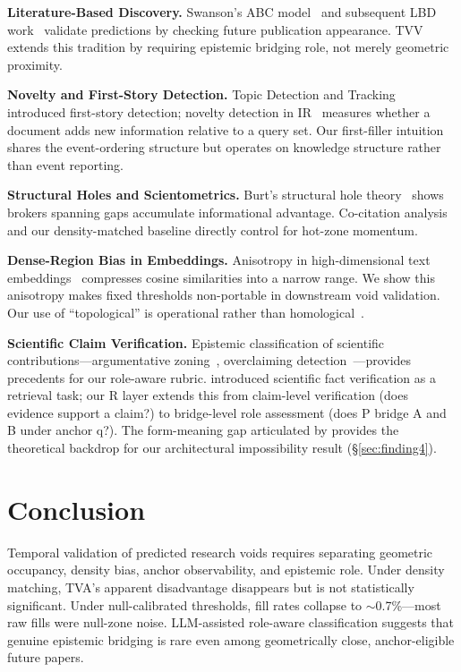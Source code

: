 \documentclass[11pt,twocolumn]{article}
\newcommand{\tva}{\textsf{TVA}}
\newcommand{\tvv}{\textsf{TVV}}
\begin{document}
\textbf{Literature-Based Discovery.}
Swanson's ABC model~\cite{swanson1986fish} and subsequent LBD work~\cite{gordon1996using,weeber2001using} validate predictions by checking future
publication appearance. \tvv{} extends this tradition by requiring epistemic bridging
role, not merely geometric proximity.

\textbf{Novelty and First-Story Detection.}
Topic Detection and Tracking~\cite{allan1998topic} introduced first-story detection; novelty detection in IR~\cite{zhang2002novelty}
measures whether a document adds new information relative to a query set. Our
first-filler intuition shares the event-ordering structure but operates on knowledge
structure rather than event reporting.

\textbf{Structural Holes and Scientometrics.}
Burt's structural hole theory~\cite{burt2004structural} shows brokers spanning gaps accumulate informational
advantage. Co-citation analysis~\cite{small1973cocitation} and our density-matched baseline directly control for hot-zone momentum.

\textbf{Dense-Region Bias in Embeddings.}
Anisotropy in high-dimensional text embeddings~\cite{ethayarajh2019contextual} compresses cosine similarities into a
narrow range. We show this anisotropy makes fixed thresholds non-portable in
downstream void validation. Our use of ``topological'' is operational rather than
homological~\cite{carlsson2009topology,edelsbrunner2010computational}.

\textbf{Scientific Claim Verification.}
Epistemic classification of scientific contributions---argumentative zoning~\cite{teufel2002summarizing},
overclaiming detection~\cite{wright2022generating}---provides precedents for our role-aware rubric. \cite{wadden2020scifact} introduced scientific fact verification as a retrieval task; our R layer extends this from claim-level verification (does evidence support a claim?) to bridge-level role assessment (does P bridge A and B under anchor q?). The form-meaning gap articulated by \cite{bender2020climbing} provides the theoretical backdrop for our architectural impossibility result (\S\ref{sec:finding4}).

\section{Conclusion}

Temporal validation of predicted research voids requires separating geometric occupancy,
density bias, anchor observability, and epistemic role.
Under density matching, \tva{}'s apparent disadvantage disappears but is not
statistically significant. Under null-calibrated thresholds, fill rates collapse to
$\sim$0.7\%---most raw fills were null-zone noise.
LLM-assisted role-aware classification suggests that genuine epistemic bridging is rare even among
geometrically close, anchor-eligible future papers.
\end{document}
